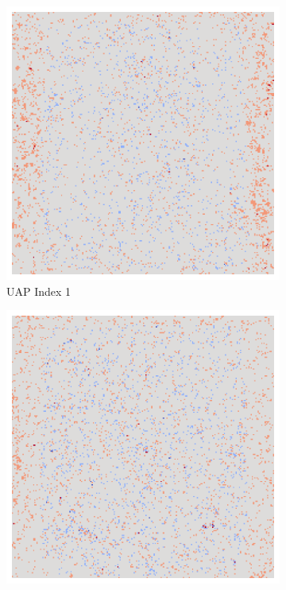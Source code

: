 \begin{figure}[ht!]
\begin{subfigure}{0.19\linewidth}
        \includegraphics[height=1\linewidth]{01-images/05-resultate/uap_resnet/uap1-resnet18-mri-n200-robustificationslevel0.png}
        \caption{UAP Index 1}
    \end{subfigure}\hfill%
    \begin{subfigure}{0.19\linewidth}
        \centering
        \includegraphics[height=1\linewidth]{01-images/05-resultate/uap_resnet/uap2-resnet18-mri-n200-robustificationslevel0.png}

\end{subfigure}
\end{figure}
